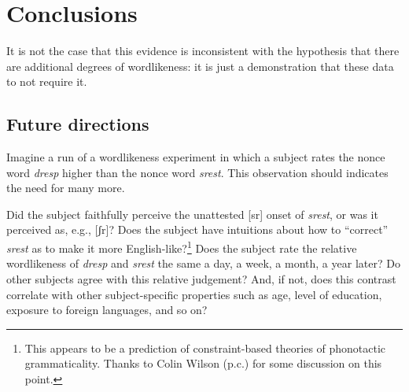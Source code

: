 \section{Conclusions}

It is not the case that this evidence is inconsistent with the hypothesis that there are additional degrees of wordlikeness: it is just a demonstration that these data to not require it. 

\subsection{Future directions}

Imagine a run of a wordlikeness experiment in which a subject rates the nonce word \emph{dresp} higher than the nonce word \emph{srest}. This observation should indicates the need for many more.

Did the subject faithfully perceive the unattested [sr] onset of \emph{srest}, or was it perceived as, e.g., [ʃr]? Does the subject have intuitions about how to ``correct'' \emph{srest} as to make it more English-like?\footnote{This appears to be a prediction of constraint-based theories of phonotactic grammaticality. Thanks to Colin Wilson (p.c.) for some discussion on this point.} Does the subject rate the relative wordlikeness of \emph{dresp} and \emph{srest} the same a day, a week, a month, a year later? 
Do other subjects agree with this relative judgement? And, if not, does this contrast correlate with other subject-specific properties such as age, level of education, exposure to foreign languages, and so on? 
